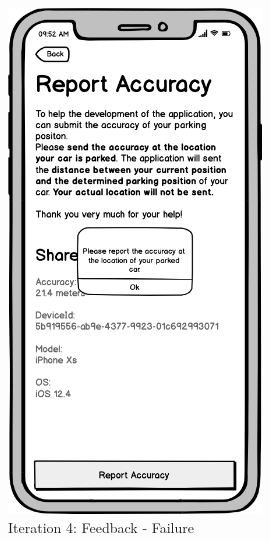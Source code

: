 \begin{figure}[H]
\begin{minipage}[b]{0.45\textwidth}
    \includegraphics[width=0.6\textwidth]{images/UI/Iteration4-Feedback-Failure.png}
    \caption{Iteration 4: Feedback - Failure}
    \label{fig:i4-feedback-fail}
  \end{minipage}
\end{figure}


